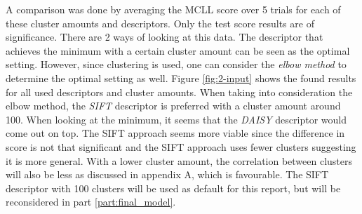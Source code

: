 A comparison was done by averaging the MCLL score over 5 trials for each of these cluster amounts and descriptors.
Only the test score results are of significance.
There are 2 ways of looking at this data.
The descriptor that achieves the minimum with a certain cluster amount can be seen as the optimal setting.
However, since clustering is used, one can consider the \emph{elbow method} to determine the optimal setting as well.
Figure \ref{fig:2-input} shows the found results for all used descriptors and cluster amounts.
When taking into consideration the elbow method, the \emph{SIFT} descriptor is preferred with a cluster amount around 100.
When looking at the minimum, it seems that the \emph{DAISY} descriptor would come out on top.
The SIFT approach seems more viable since the difference in score is not that significant and the SIFT approach uses fewer clusters suggesting it is more general.
With a lower cluster amount, the correlation between clusters will also be less as discussed in appendix A, which is favourable.
The SIFT descriptor with 100 clusters will be used as default for this report, but will be reconsidered in part \ref{part:final_model}.

